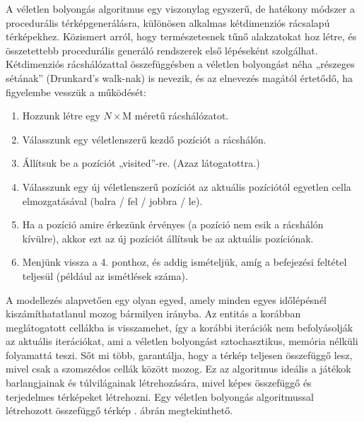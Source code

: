 A véletlen bolyongás algoritmus egy viszonylag egyszerű, de hatékony módszer a procedurális térképgenerálásra, különösen alkalmas kétdimenziós rácsalapú térképekhez. Közismert arról, hogy természetesnek tűnő alakzatokat hoz létre, és összetettebb procedurális generáló rendszerek első lépéseként szolgálhat. Kétdimenziós rácshálózattal összefüggésben a véletlen bolyongást néha „részeges sétának” (Drunkard’s walk-nak) is nevezik, és az elnevezés magától értetődő, ha figyelembe vesszük a működését:\cite{randomwalk}
\begin{enumerate}
\item Hozzunk létre egy $N \times $M méretű rácshálózatot.
\item Válasszunk egy véletlenszerű kezdő pozíciót a rácshálón.
\item Állítsuk be a pozíciót „visited”-re. (Azaz látogatottra.)
\item Válasszunk egy új véletlenszerű pozíciót az aktuális pozíciótól egyetlen cella elmozgatásával (balra / fel / jobbra / le).
\item Ha a pozíció amire érkezünk érvényes (a pozíció nem esik a rácshálón kívülre), akkor ezt az új pozíciót állítsuk be az aktuális pozíciónak.
\item Menjünk vissza a 4. ponthoz, és addig ismételjük, amíg a befejezési feltétel teljesül (például az ismétlések száma).
\end{enumerate}

A modellezés alapvetően egy olyan egyed, amely minden egyes időlépésnél kiszámíthatatlanul mozog bármilyen irányba. Az entitás a korábban meglátogatott cellákba is visszamehet, így a korábbi iterációk nem befolyásolják az aktuális iterációkat, ami a véletlen bolyongást sztochasztikus, memória nélküli folyamattá teszi. Sőt mi több, garantálja, hogy a térkép teljesen összefüggő lesz, mivel csak a szomszédos cellák között mozog. Ez az algoritmus ideális a játékok barlangjainak és túlvilágainak létrehozására, mivel képes összefüggő és terjedelmes térképeket létrehozni.\cite{randomwalk} Egy véletlen bolyongás algoritmussal létrehozott összefüggő térkép . ábrán megtekinthető.

